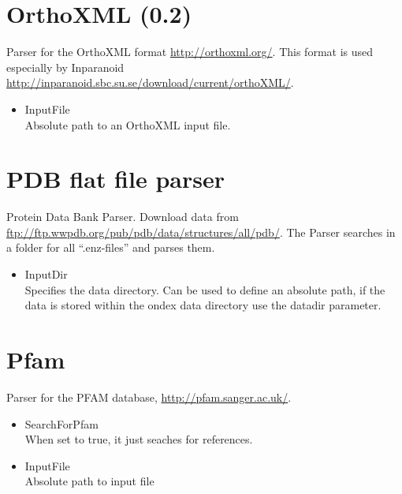 \section{OrthoXML (0.2)}
Parser for the OrthoXML format \url{http://orthoxml.org/}.
This format is used especially by Inparanoid \url{http://inparanoid.sbc.su.se/download/current/orthoXML/}.
\begin{itemize}
  \item{InputFile}\\
  Absolute path to an OrthoXML input file.
\end{itemize}   

\section{PDB flat file parser}
Protein Data Bank Parser. Download data from \url{ftp://ftp.wwpdb.org/pub/pdb/data/structures/all/pdb/}.
The Parser searches in a folder for all ``.enz-files'' and parses them.
\begin{itemize}
  \item{InputDir}\\
  Specifies the data directory.
  Can be used to define an absolute path, if the data is stored within the ondex data directory use the datadir parameter.
\end{itemize}
    
\section{Pfam}
Parser for the PFAM database, \url{http://pfam.sanger.ac.uk/}.
\begin{itemize}
  \item{SearchForPfam}\\
  When set to true, it just seaches for references.
  \item{InputFile}\\
  Absolute path to input file 
\end{itemize}
     
